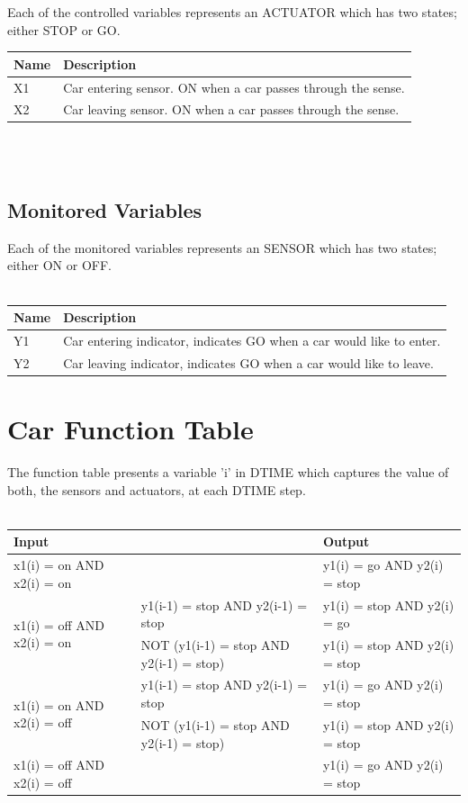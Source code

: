 \documentclass[fontsize=12pt,paper=letter,twoside]{scrartcl}
\begin{document}
{Each of the controlled variables represents an ACTUATOR which has two states; either STOP or GO.\\} 

\begin{tabular}{ | p{2cm} | p{12cm}  |}
\hline
Name & Description  \\
\hline
X1 & Car entering sensor. ON when a car passes through the sense.    \\
\hline
X2 & Car leaving sensor. ON when a car passes through the sense.    \\
\hline
\end{tabular}
\\
\\

\subsection{Monitored Variables}
{Each of the monitored variables represents an SENSOR which has two states; either ON or OFF.\\}\\

\begin{tabular}{ | p{2cm} | p{12cm}  |}
\hline
Name & Description  \\
\hline
Y1 & Car entering indicator, indicates GO when a car would like to enter.    \\
\hline
Y2 & Car leaving indicator, indicates GO when a car would like to leave.    \\
\hline
\end{tabular}

\newpage
\section{Car Function Table}
{The function table presents a variable 'i' in DTIME which captures the value of both, the sensors and actuators, at each DTIME step.}
\\
\\
\begin{tabular}{ | p{5cm} | p{5cm} || p{5cm} || }
\hline
Input &  & Output \\
\hline
x1(i) = on AND x2(i) = on &  & y1(i) = go AND y2(i) = stop \\
\hline
\multirow{2}{*}{x1(i) = off AND x2(i) = on} & y1(i-1) = stop AND y2(i-1) = stop & y1(i) = stop AND y2(i) = go \\
\cline{2-3}
 & NOT (y1(i-1) = stop AND y2(i-1) = stop) & y1(i) = stop AND y2(i) = stop \\
\hline
\multirow{2}{*}{x1(i) = on AND x2(i) = off} & y1(i-1) = stop AND y2(i-1) = stop & y1(i) = go AND y2(i) = stop \\
\cline{2-3}
 & NOT (y1(i-1) = stop AND y2(i-1) = stop) & y1(i) = stop AND y2(i) = stop \\
\hline
x1(i) = off AND x2(i) = off &  & y1(i) = go AND y2(i) = stop\\
\hline
\end{tabular}


\end{document}
